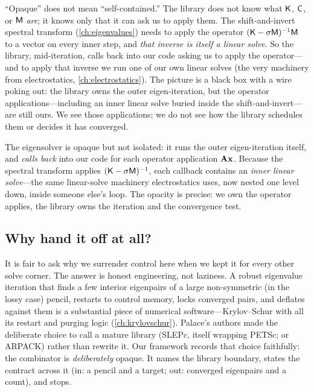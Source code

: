 ``Opaque'' does not mean ``self-contained.'' The library does not know what
$\mathsf{K}$, $\mathsf{C}$, or $\mathsf{M}$ \emph{are}; it knows only that it can ask us to apply
them. The shift-and-invert spectral transform (\cref{ch:eigenvalues}) needs to
apply the operator $(\mathsf{K}-\sigma\mathsf{M})^{-1}\mathsf{M}$ to a vector on every inner step,
and \emph{that inverse is itself a linear solve}. So the library, mid-iteration,
calls back into our code asking us to apply the operator---and to apply that
inverse we run one of our own linear solves (the very 
machinery from electrostatics, \cref{ch:electrostatics}). The picture is a black
box with a wire poking out: the library owns the outer eigen-iteration, but the
operator applications---including an inner linear solve buried inside the
shift-and-invert---are still ours. We see those applications; we do not see how
the library schedules them or decides it has converged.

\begin{keyidea}
The eigensolver is opaque but not isolated: it runs the outer eigen-iteration
itself, and \emph{calls back} into our code for each operator application
$\mathbf A\mathbf{x}$. Because the spectral transform applies $(\mathsf{K}-\sigma\mathsf{M})^{-1}$,
each callback contains an \emph{inner linear solve}---the same linear-solve
machinery electrostatics uses, now nested one level down, inside someone else's
loop. The opacity is precise: we own the operator applies, the library owns the
iteration and the convergence test.

\end{keyidea}

\subsection{Why hand it off at all?}

It is fair to ask why we surrender control here when we kept it for every other
solve corner. The answer is honest engineering, not laziness. A robust
eigenvalue iteration that finds a few interior eigenpairs of a large
non-symmetric (in the lossy case) pencil, restarts to control memory, locks
converged pairs, and deflates against them is a substantial piece of numerical
software---Krylov--Schur with all its restart and purging logic
(\cref{ch:krylovschur}). Palace's authors made the deliberate choice to call a
mature library (SLEPc, itself wrapping PETSc; or ARPACK) rather than rewrite it.
Our framework records that choice faithfully: the  combinator is
\emph{deliberately} opaque. It names the library boundary, states the contract
across it (in: a pencil and a target; out: converged eigenpairs and a count), and
stops.

